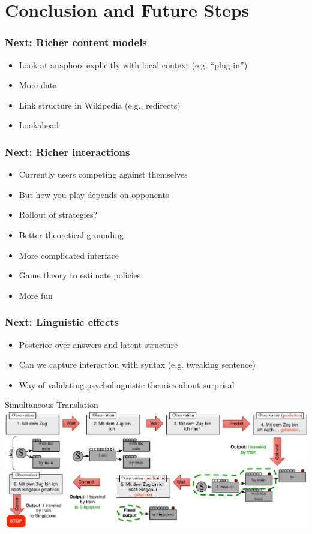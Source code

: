 
\section{Conclusion and Future Steps}



\begin{frame}
	\frametitle{Next: Richer content models}
	\begin{itemize}
		\item Look at anaphors explicitly with local context (e.g. ``plug in'')
		\item More data
		\item Link structure in Wikipedia (e.g., redirects)
		\item Lookahead
	\end{itemize}
\end{frame}

\begin{frame}
	\frametitle{Next: Richer interactions}
		\begin{itemize}
			\item Currently users competing against themselves
			\item But how you play depends on opponents
			\item Rollout of strategies?~\cite{tesauro-96}
			\item Better theoretical grounding~\cite{li-08}
			\item More complicated interface
			\item Game theory to estimate policies
			\item More fun
		\end{itemize}
\end{frame}

\begin{frame}
	\frametitle{Next: Linguistic effects}
		\begin{itemize}
			\item Posterior over answers and latent structure
			\item Can we capture interaction with syntax (e.g. tweaking sentence)
			\item Way of validating psycholinguistic theories about surprisal
		\end{itemize}
\end{frame}

\begin{frame}{Simultaneous Translation}
  \centering
  \includegraphics[width=1.0\linewidth]{qb/incremental_translation}
\end{frame}

